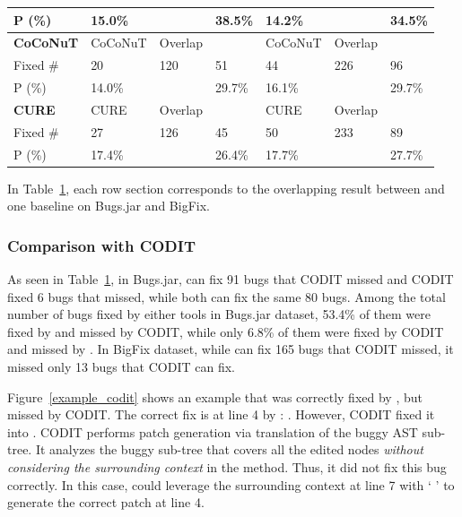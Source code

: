 {{\begin{table}[t]
\begin{center}
\begin{tabular}{p{1cm}<{\centering}|p{1.1cm}<{\centering}|p{0.8cm}<{\centering}|p{0.7cm}<{\centering}|p{1.1cm}<{\centering}|p{0.8cm}<{\centering}|p{0.7cm}<{\centering}}
			P (\%)            &  15.0\%  &    & 38.5\%  &  14.2\%  &    &  34.5\%\\
			\hline
			{\bf CoCoNuT}             & CoCoNuT   & Overlap   & \tool  & CoCoNuT   & Overlap   & \tool \\
			\hline
			Fixed \#     & \cellcolor{mygray} 20  & 120   & \cellcolor{mygray} 51 & \cellcolor{mygray}44 &  226  & \cellcolor{mygray} 96\\
			P (\%)            &  14.0\%  &    &  29.7\% &  16.1\%  &    & 29.7\% \\
			\hline
			{\bf CURE}             & CURE   & Overlap   & \tool  & CURE   & Overlap   & \tool \\
			\hline
			Fixed \#     & \cellcolor{mygray} 27  &  126  & \cellcolor{mygray} 45 & \cellcolor{mygray} 50&  233  & \cellcolor{mygray} 89\\
			P (\%)            &  17.4\%  &    & 26.4\%  & 17.7\%   &    &  27.7\%\\
			\hline
		\end{tabular}
		\label{RQ3_results}
	\end{center}
\end{table}
}}

In Table~\ref{RQ3_results}, each row section corresponds to the
overlapping result between {\tool} and one baseline on Bugs.jar and BigFix.

\subsubsection{{\bf Comparison with CODIT}}

As seen in Table~\ref{RQ3_results}, in Bugs.jar, {\tool} can fix 91
bugs that CODIT missed and CODIT fixed 6 bugs that {\tool} missed,
while both can fix the same 80 bugs. Among the total number of bugs
fixed by either tools in Bugs.jar dataset, 53.4\% of them were fixed by
{\tool} and missed by CODIT, while only 6.8\% of them were fixed by
CODIT and missed by {\tool}. In BigFix dataset, while {\tool} can fix
165 bugs that CODIT missed, it missed only 13 bugs that CODIT can fix.



Figure~\ref{example_codit} shows an example that was correctly fixed
by {\tool}, but missed by CODIT. The correct fix is at line 4 by
{\tool}:    
.  However, CODIT fixed it into 
 . CODIT performs patch generation via
translation of the buggy AST sub-tree. It analyzes the buggy sub-tree
that covers all the edited nodes {\em without considering the
  surrounding context} in the method.  Thus, it did not fix this bug
correctly. In this case, {\tool} could leverage the surrounding
context at line 7 with ` 
' to generate the correct patch at line 4.


